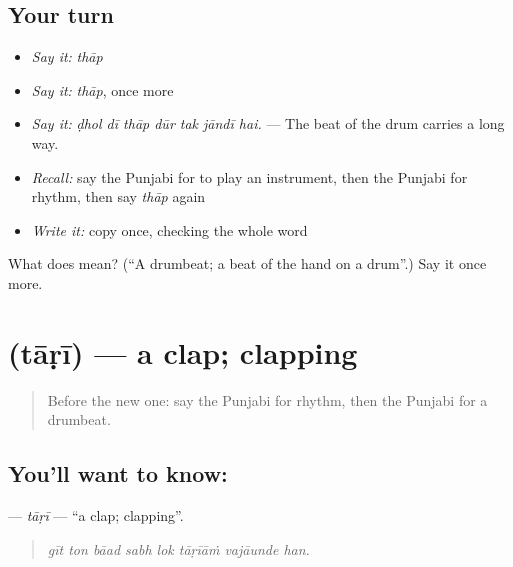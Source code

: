 \subsection*{Your turn}
\begin{itemize}
\raggedright
  \item \emph{Say it:} \emph{thāp}
  \item \emph{Say it:} \emph{thāp}, once more
  \item \emph{Say it:} \emph{ḍhol dī thāp dūr tak jāndī hai.} — The beat of the drum carries a long way.
  \item \emph{Recall:} say the Punjabi for to play an instrument, then the Punjabi for rhythm, then say \emph{thāp} again
  \item \emph{Write it:} copy \textbf{} once, checking the whole word
\end{itemize}

\begin{tcolorbox}[breakable,colback=teal!4,colframe=teal!35!black,title={Before you move on}]
What does  mean? (\textquotedblleft{}A drumbeat; a beat of the hand on a drum\textquotedblright{}.) Say it once more.
\end{tcolorbox}
\section[\texorpdfstring{\pa{ਤਾੜੀ} (tāṛī)}{ਤਾੜੀ (tāṛī)}]{ (tāṛī) — a clap; clapping}

\label{lesson:PA-C347-tari}



\begin{quote}
Before the new one: say the Punjabi for rhythm, then the Punjabi for a drumbeat.
\end{quote}

\subsection*{You'll want to know: }
\textbf{} — \emph{tāṛī} — \textquotedblleft{}a clap; clapping\textquotedblright{}.

\begin{quote}
       
\end{quote}

\begin{quote}
\emph{gīt ton bāad sabh lok tāṛīāṁ vajāunde han.}
\end{quote}


